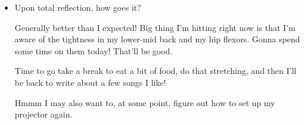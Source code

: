 \documentclass[12pt]{article}
\renewcommand{\,}{\textsuperscript{,}}
\begin{document}
\begin{itemize}
\begin{itemize}
Generally ok!

\end{itemize}  
 \item Upon total reflection, how goes it?

Generally better than I expected! Big thing I'm hitting right now is that I'm aware of the tightness in my lower-mid back and my hip flexors. Gonna spend some time on them today! That'll be good.

Time to go take a break to eat a bit of food, do that stretching, and then I'll be back to write about a few songs I like!

Hmmm I may also want to, at some point, figure out how to set up my projector again.  
\end{itemize}  
\end{document}
